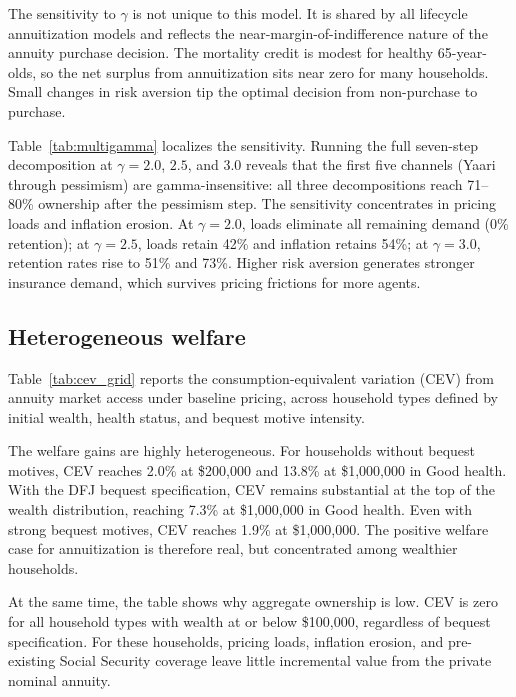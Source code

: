 \documentclass[12pt]{article}
\begin{document}
The sensitivity to $\gamma$ is not unique to this model. It is shared by all lifecycle annuitization models and reflects the near-margin-of-indifference nature of the annuity purchase decision. The mortality credit is modest for healthy 65-year-olds, so the net surplus from annuitization sits near zero for many households. Small changes in risk aversion tip the optimal decision from non-purchase to purchase.

Table~\ref{tab:multigamma} localizes the sensitivity. Running the full seven-step decomposition at $\gamma = 2.0$, $2.5$, and $3.0$ reveals that the first five channels (Yaari through pessimism) are gamma-insensitive: all three decompositions reach 71--80\% ownership after the pessimism step. The sensitivity concentrates in pricing loads and inflation erosion. At $\gamma = 2.0$, loads eliminate all remaining demand (0\% retention); at $\gamma = 2.5$, loads retain 42\% and inflation retains 54\%; at $\gamma = 3.0$, retention rates rise to 51\% and 73\%. Higher risk aversion generates stronger insurance demand, which survives pricing frictions for more agents.



\subsection{Heterogeneous welfare}

Table~\ref{tab:cev_grid} reports the consumption-equivalent variation (CEV) from annuity market access under baseline pricing, across household types defined by initial wealth, health status, and bequest motive intensity.



The welfare gains are highly heterogeneous. For households without bequest motives, CEV reaches 2.0\% at \$200,000 and 13.8\% at \$1,000,000 in Good health. With the DFJ bequest specification, CEV remains substantial at the top of the wealth distribution, reaching 7.3\% at \$1,000,000 in Good health. Even with strong bequest motives, CEV reaches 1.9\% at \$1,000,000. The positive welfare case for annuitization is therefore real, but concentrated among wealthier households.

At the same time, the table shows why aggregate ownership is low. CEV is zero for all household types with wealth at or below \$100,000, regardless of bequest specification. For these households, pricing loads, inflation erosion, and pre-existing Social Security coverage leave little incremental value from the private nominal annuity.
\end{document}
